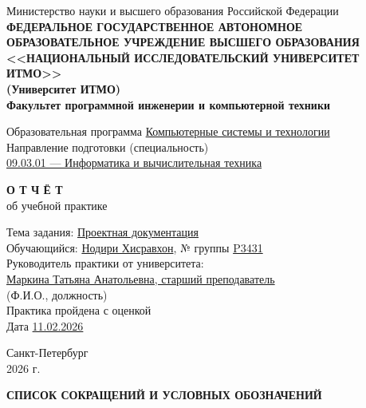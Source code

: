 \documentclass[a4paper,14pt]{extarticle}
\begin{document}
\begin{titlepage}
\thispagestyle{empty}
\vspace{4pt}
\begin{center}
Министерство науки и высшего образования Российской Федерации\\
\textbf{ФЕДЕРАЛЬНОЕ ГОСУДАРСТВЕННОЕ АВТОНОМНОЕ ОБРАЗОВАТЕЛЬНОЕ УЧРЕЖДЕНИЕ ВЫСШЕГО ОБРАЗОВАНИЯ}\\
\textbf{<<НАЦИОНАЛЬНЫЙ ИССЛЕДОВАТЕЛЬСКИЙ УНИВЕРСИТЕТ ИТМО>>}\\
\textbf{(Университет ИТМО)}\\[8pt]
\textbf{Факультет программной инженерии и компьютерной техники}
\end{center}
\vspace{10pt}
Образовательная программа \underline{Компьютерные системы и технологии}\\[6pt]
Направление подготовки (специальность) \\
\underline{09.03.01 --- Информатика и вычислительная техника}\\[18pt]
\begin{center}
{\large \textbf{О Т Ч Ё Т}}\\[6pt]
об учебной практике
\end{center}
\vspace{12pt}
Тема задания: \underline{Проектная документация}\\[10pt]
Обучающийся: \underline{Нодири Хисравхон}, № группы \underline{P3431}\\[12pt]
Руководитель практики от университета:\\
\underline{Маркина Татьяна Анатольевна, старший преподаватель}\\
\hspace*{8cm}(Ф.И.О., должность)\\[14pt]
Практика пройдена с оценкой \underline{\hspace{2cm}}\\[12pt]
Дата \underline{11.02.2026}
\vfill
\begin{center}
Санкт-Петербург\\
2026 г.
\end{center}
\end{titlepage}

\thispagestyle{fancy}
\tableofcontents
\newpage

\begin{center}
\textbf{СПИСОК СОКРАЩЕНИЙ И УСЛОВНЫХ ОБОЗНАЧЕНИЙ}
\end{center}
\end{document}
